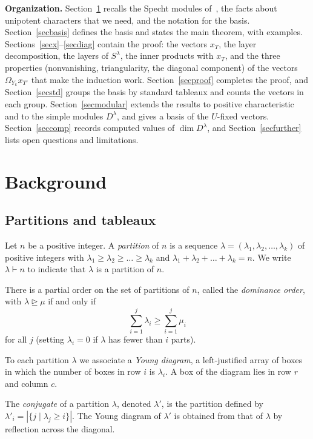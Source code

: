 \documentclass[11pt, letterpaper]{amsart}
\theoremstyle{definition}
\theoremstyle{remark}
\begin{document}
\medskip
\noindent\textbf{Organization.} Section~\ref{secback} recalls the Specht modules of~\cite{AN2}, the facts about unipotent characters that we need, and the notation for the basis. Section~\ref{secbasis} defines the basis and states the main theorem, with examples. Sections~\ref{secx}--\ref{secdiag} contain the proof: the vectors $x_T$, the layer decomposition, the layers of $S^\lambda$, the inner products with $x_T$, and the three properties (nonvanishing, triangularity, the diagonal component) of the vectors $\Omega_{Y_k}x_{T'}$ that make the induction work. Section~\ref{secproof} completes the proof, and Section~\ref{secstd} groups the basis by standard tableaux and counts the vectors in each group. Section~\ref{secmodular} extends the results to positive characteristic and to the simple modules $D^\lambda$, and gives a basis of the $U$-fixed vectors. Section~\ref{seccomp} records computed values of $\dim D^\lambda$, and Section~\ref{secfurther} lists open questions and limitations.

\section{Background}\label{secback}

\subsection{Partitions and tableaux}

Let $n$ be a positive integer. A \emph{partition} of $n$ is a sequence $\lambda=(\lambda_1,\lambda_2,\dots,\lambda_k)$ of positive integers with $\lambda_1\ge\lambda_2\ge\dots\ge\lambda_k$ and $\lambda_1+\lambda_2+\dots+\lambda_k=n$. We write $\lambda\vdash n$ to indicate that $\lambda$ is a partition of $n$.

There is a partial order on the set of partitions of $n$, called the \emph{dominance order}, with $\lambda\trianglerighteq\mu$ if and only if
\[
\sum_{i=1}^{j}\lambda_i\ge\sum_{i=1}^{j}\mu_i
\]
for all $j$ (setting $\lambda_i=0$ if $\lambda$ has fewer than $i$ parts).

To each partition $\lambda$ we associate a \emph{Young diagram}, a left-justified array of boxes in which the number of boxes in row $i$ is $\lambda_i$. A box of the diagram lies in row $r$ and column $c$.

The \emph{conjugate} of a partition $\lambda$, denoted $\lambda'$, is the partition defined by $\lambda'_i=|\{j\mid\lambda_j\ge i\}|$. The Young diagram of $\lambda'$ is obtained from that of $\lambda$ by reflection across the diagonal.
\end{document}
